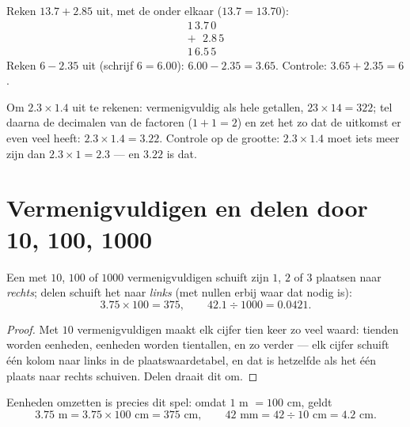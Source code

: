 \begin{example}\label{ex:g6:decimals:addsub}
Reken $13.7 + 2.85$ uit, met de  onder elkaar
($13.7 = 13.70$):
\[
\begin{array}{r}
1\,3.7\,0 \\
+\ \ \,2.8\,5 \\
\hline
1\,6.5\,5
\end{array}
\]
Reken $6 - 2.35$ uit (schrijf $6 = 6.00$): $6.00 - 2.35 = 3.65$. Controle:
$3.65 + 2.35 = 6$.
\end{example}

\begin{example}\label{ex:g6:decimals:mult}
Om $2.3 \times 1.4$ uit te rekenen: vermenigvuldig als hele getallen,
$23 \times 14 = 322$; tel daarna de decimalen van de factoren
($1 + 1 = 2$) en zet het  zo dat de uitkomst er even veel heeft:
$2.3 \times 1.4 = 3.22$. Controle op de grootte: $2.3 \times 1.4$ moet iets
meer zijn dan $2.3 \times 1 = 2.3$ --- en $3.22$ is dat.
\end{example}

\section{Vermenigvuldigen en delen door 10, 100, 1000}

\begin{proposition}\label{prop:g6:decimals:shift}
Een  met $10$, $100$ of $1000$ vermenigvuldigen schuift zijn
 $1$, $2$ of $3$ plaatsen naar \emph{rechts}; delen schuift het
naar \emph{links} (met nullen erbij waar dat nodig is):
\[
3.75 \times 100 = 375, \qquad
42.1 \div 1000 = 0.0421 .
\]
\end{proposition}

\begin{proof}
Met $10$ vermenigvuldigen maakt elk cijfer tien keer zo veel waard: tienden
worden eenheden, eenheden worden tientallen, en zo verder --- elk cijfer
schuift één kolom naar links in de plaatswaardetabel, en dat is hetzelfde als
het  één plaats naar rechts schuiven. Delen draait dit om.
\end{proof}

\begin{example}[Maateenheden]\label{ex:g6:decimals:units}
Eenheden omzetten is precies dit spel: omdat $1$ m $= 100$ cm, geldt
\[
3.75 \text{ m} = 3.75 \times 100 \text{ cm} = 375 \text{ cm},
\qquad
42 \text{ mm} = 42 \div 10 \text{ cm} = 4.2 \text{ cm}.
\]
\end{example}

